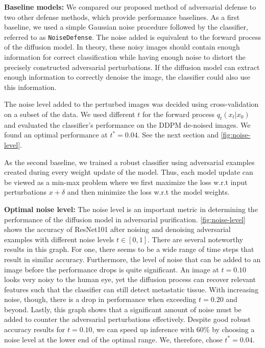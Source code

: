 \textbf{Baseline models:} We compared our proposed method of adversarial defense to two other defense methods, which provide performance baselines. As a first baseline, we used a simple Gaussian noise procedure followed by the classifier, referred to as \texttt{NoiseDefense}. The noise added is equivalent to the forward process of the diffusion model. In theory, these noisy images should contain enough information for correct classification while having enough noise to distort the precisely constructed adversarial perturbations. If the diffusion model can extract enough information to correctly denoise the image, the classifier could also use this information.

The noise level added to the perturbed images was decided using cross-validation on a subset of the data. We used different $t$ for the forward process $q_t(x_t|x_0)$ and evaluated the classifier's performance on the DDPM de-noised images. We found an optimal performance at $t^*=0.04$. See the next section and \autoref{fig:noise-level}.

As the second baseline, we trained a robust classifier using adversarial examples created during every weight update of the model. Thus, each model update can be viewed as a min-max problem where we first maximize the loss w.r.t input perturbations $x+\delta$ and then minimize the loss w.r.t the model weights.


\textbf{Optimal noise level:}
The noise level is an important metric in determining the performance of the diffusion model in adversarial purification. \autoref{fig:noise-level} shows the accuracy of ResNet101 after noising and denoising adversarial examples with different noise levels $t\in[0, 1]$. There are several noteworthy results in this graph. For one, there seems to be a wide range of time steps that result in similar accuracy. Furthermore, the level of noise that can be added to an image before the performance drops is quite significant. An image at $t=0.10$ looks very noisy to the human eye, yet the diffusion process can recover relevant features such that the classifier can still detect metastatic tissue. With increasing noise, though, there is a drop in performance when exceeding $t=0.20$ and beyond. Lastly, this graph shows that a significant amount of noise must be added to counter the adversarial perturbations effectively. Despite good robust accuracy results for $t=0.10$, we can speed up inference with 60\% by choosing a noise level at the lower end of the optimal range. We, therefore, chose $t^*=0.04$.



